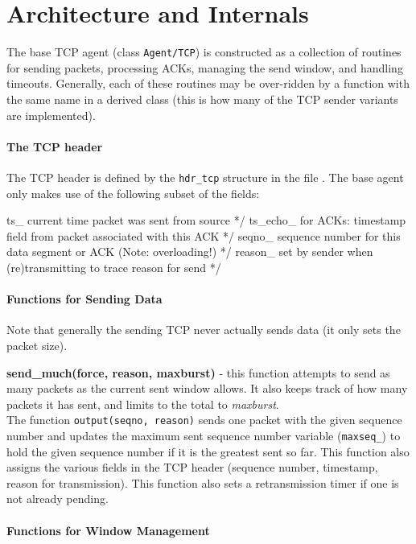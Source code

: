 \section{Architecture and Internals}
\label{sec:tcparchitecture}

The base TCP agent (class {\tt Agent/TCP}) is constructed
as a collection of routines for sending packets, processing ACKs,
managing the send window, and handling timeouts.
Generally, each of these routines may be over-ridden by a
function with the same name in a derived class (this is how
many of the TCP sender variants are implemented).

\paragraph{The TCP header}
The TCP header is defined by the {\tt hdr\_tcp} structure
in the file .
The base agent only makes use of the following subset of the fields:
\begin{program}
ts_	\* current time packet was sent from source */
ts_echo_ \* for ACKs: timestamp field from packet associated with this ACK */
seqno_ \* sequence number for this data segment or ACK (Note: overloading!) */
reason_ \* set by sender when (re)transmitting to trace reason for send */
\end{program}

\paragraph{Functions for Sending Data}
Note that generally the sending TCP never actually sends
data (it only sets the packet size).

{\bf send\_much(force, reason, maxburst)} - this function
attempts to send as many packets as the current sent window allows.
It also keeps track of how many packets it has sent, and limits to the
total to {\em maxburst}. \\
The function {\tt output(seqno, reason)} sends one packet
with the given sequence number and updates the maximum sent sequence
number variable ({\tt maxseq\_}) to hold the given sequence number if
it is the greatest sent so far.
This function also assigns the various fields in the TCP
header (sequence number, timestamp, reason for transmission).
This function also sets a retransmission timer if one is not already
pending.

\paragraph{Functions for Window Management}

